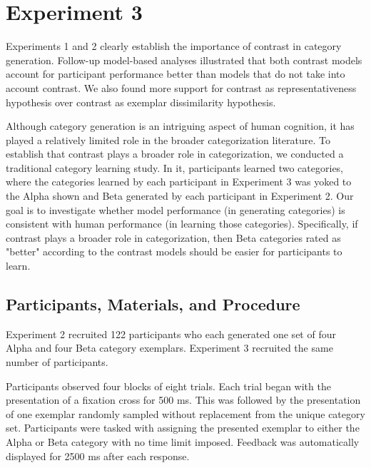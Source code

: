 

% 
\section{Experiment 3}

Experiments 1 and 2 clearly establish the importance of contrast in category
generation. Follow-up model-based analyses illustrated that both contrast models
account for participant performance better than models that do not take into
account contrast. We also found more support for contrast as representativeness
hypothesis over contrast as exemplar dissimilarity hypothesis.

Although category generation is an intriguing aspect of human cognition, it has
played a relatively limited role in the broader categorization literature. To
establish that contrast plays a broader role in categorization, we conducted a
traditional category learning study. In it, participants learned two categories,
where the categories learned by each participant in Experiment 3 was yoked to
the Alpha shown and Beta generated by each participant in Experiment 2. Our goal
is to investigate whether model performance (in generating categories) is
consistent with human performance (in learning those categories). Specifically, if contrast plays a broader role in categorization, then Beta categories rated as "better" according
to the contrast models should be easier for participants to learn.
\subsection{Participants, Materials, and Procedure}

Experiment 2 recruited 122 participants who each generated one set of four Alpha
and four Beta category exemplars. Experiment 3 recruited the same number of
participants.

Participants observed four blocks of eight trials. Each trial began with the
presentation of a fixation cross for 500 ms. This was followed by the
presentation of one exemplar randomly sampled without replacement from the
unique category set. Participants were tasked with assigning the presented
exemplar to either the Alpha or Beta category with no time limit imposed.
Feedback was automatically displayed for 2500 ms after each response.


